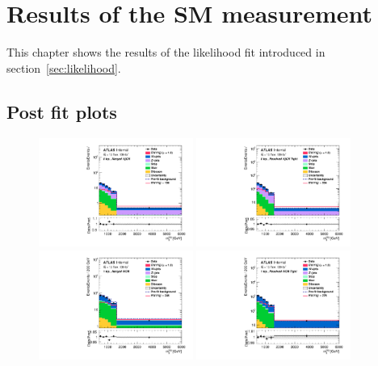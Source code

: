 \chapter{Results of the SM measurement}
\label{chap:results}

This chapter shows the results of the likelihood fit introduced in section~\ref{sec:likelihood}.
\section{Post fit plots}
\begin{figure}[H]
    \centering
    \includegraphics[width=0.45\textwidth]{figures/PostFit/Region_distMTagJets_DCRVjetMer_BMin0_J0_incJet1_L0_T0_incFat1_Y6051_incTag1_Fat1_GlobalFit_unconditionnal_mu1log}
    \includegraphics[width=0.45\textwidth]{figures/PostFit/Region_distMTagJets_DCRVjetFid_BMin0_T0_Y6051_incTag1_J2_L0_incJet1_GlobalFit_unconditionnal_mu1log}
    \\
    \includegraphics[width=0.45\textwidth]{figures/PostFit/Region_disttagMjj_DCRVjetMerged_BMin0_J0_incJet1_L1_T0_incFat1_Y6051_incTag1_Fat1_GlobalFit_unconditionnal_mu1log}
    \includegraphics[width=0.45\textwidth]{figures/PostFit/Region_disttagMjj_DCRVjetTight_BMin0_T0_Y6051_incTag1_J2_L1_incJet1_GlobalFit_unconditionnal_mu1log}

\end{figure}
